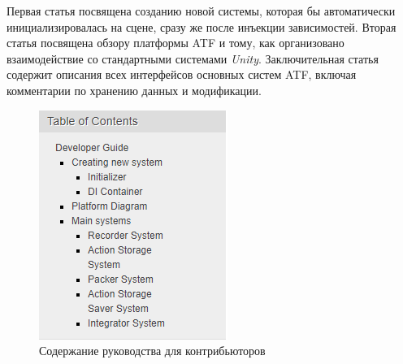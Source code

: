 Первая статья посвящена созданию новой системы, которая бы автоматически инициализировалась на сцене, сразу же после инъекции зависимостей. Вторая статья посвящена обзору платформы ATF и тому, как организовано взаимодействие со стандартными системами \textit{Unity}. Заключительная статья содержит описания всех интерфейсов основных систем ATF, включая комментарии по хранению данных и модификации.

\begin{figure}[H]
	\centering
	\includegraphics[width=0.3\linewidth]{dev_guide.PNG}
	\caption{Содержание руководства для контрибьюторов}
	\label{dev_online_docs}
\end{figure}
